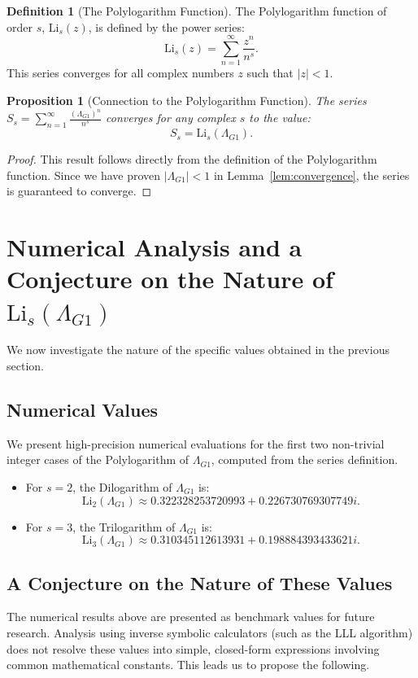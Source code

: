 \documentclass{amsart}
\theoremstyle{plain}
\newtheorem{proposition}[theorem]{Proposition} %
\theoremstyle{definition}
\newtheorem{definition}[theorem]{Definition}
\theoremstyle{remark}
\newcommand{\LambdaG}{\Lambda_{G1}}
\begin{document}
\begin{definition}[The Polylogarithm Function]
The Polylogarithm function of order $s$, $\mathrm{Li}_s(z)$, is defined by the power series:
$$ \mathrm{Li}_s(z) = \sum_{n=1}^{\infty} \frac{z^n}{n^s}. $$
This series converges for all complex numbers $z$ such that $|z|<1$.
\end{definition}

\begin{proposition}[Connection to the Polylogarithm Function]
The series $S_s = \sum_{n=1}^{\infty} \frac{(\LambdaG)^{n}}{n^s}$ converges for any complex $s$ to the value:
$$S_s = \mathrm{Li}_s(\LambdaG).$$
\end{proposition}
\begin{proof}
This result follows directly from the definition of the Polylogarithm function. Since we have proven $|\LambdaG| < 1$ in Lemma~\ref{lem:convergence}, the series is guaranteed to converge.
\end{proof}

\section{Numerical Analysis and a Conjecture on the Nature of \texorpdfstring{$\mathrm{Li}_s(\LambdaG)$}{Li\_s(Lambda\_G1)}}
We now investigate the nature of the specific values obtained in the previous section.

\subsection{Numerical Values}
We present high-precision numerical evaluations for the first two non-trivial integer cases of the Polylogarithm of $\LambdaG$, computed from the series definition.
\begin{itemize}
    \item For $s=2$, the Dilogarithm of $\LambdaG$ is:
    $$ \mathrm{Li}_2(\LambdaG) \approx 0.322328253720993 + 0.226730769307749i. $$
    \item For $s=3$, the Trilogarithm of $\LambdaG$ is:
    $$ \mathrm{Li}_3(\LambdaG) \approx 0.310345112613931 + 0.198884393433621i. $$
\end{itemize}

\subsection{A Conjecture on the Nature of These Values}
The numerical results above are presented as benchmark values for future research. Analysis using inverse symbolic calculators (such as the LLL algorithm) does not resolve these values into simple, closed-form expressions involving common mathematical constants. This leads us to propose the following.
\end{document}

